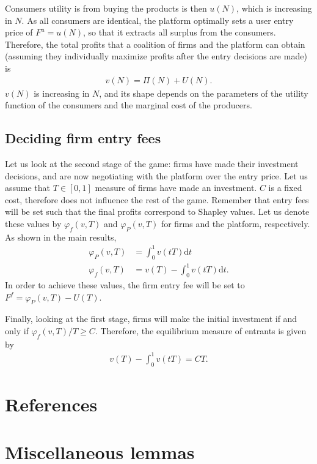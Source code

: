 \documentclass[a4paper]{article}
\newcommand{\dt}{\mathrm{d}t}
\begin{document}
Consumers utility is from buying the products is then $u(N)$, which is increasing in $N$. As all consumers are identical, the platform optimally sets a user entry price of $F^u = u(N)$, so that it extracts all surplus from the consumers. Therefore, the total profits that a coalition of firms and the platform can obtain (assuming they individually maximize profits after the entry decisions are made) is
\begin{align*}
    v(N) = \Pi(N) + U(N).
\end{align*}
$v(N)$ is increasing in $N$, and its shape depends on the parameters of the utility function of the consumers and the marginal cost of the producers.

\subsection{Deciding firm entry fees}

Let us look at the second stage of the game: firms have made their investment decisions, and are now negotiating with the platform over the entry price. Let us assume that $T \in [0, 1]$ measure of firms have made an investment. $C$ is a fixed cost, therefore does not influence the rest of the game. Remember that entry fees will be set such that the final profits correspond to Shapley values. Let us denote these values by $\varphi_f(v, T)$ and $\varphi_P(v, T)$ for firms and the platform, respectively. As shown in the main results,
\begin{align*}
    \varphi_P(v, T) &= \int_0^1 v(tT) \dt \\
    \varphi_f(v, T) &= v(T) - \int_0^1 v(tT) \dt.
\end{align*}
In order to achieve these values, the firm entry fee will be set to $F^f = \varphi_P(v, T) - U(T)$.

Finally, looking at the first stage, firms will make the initial investment if and only if $\varphi_f(v, T) / T \geq C$. Therefore, the equilibrium measure of entrants is given by
\begin{align*}
    v(T) - \int_0^1 v(tT) = CT.
\end{align*}


\appendix

\section{References}

\printbibliography

\section{Miscellaneous lemmas}
\end{document}
